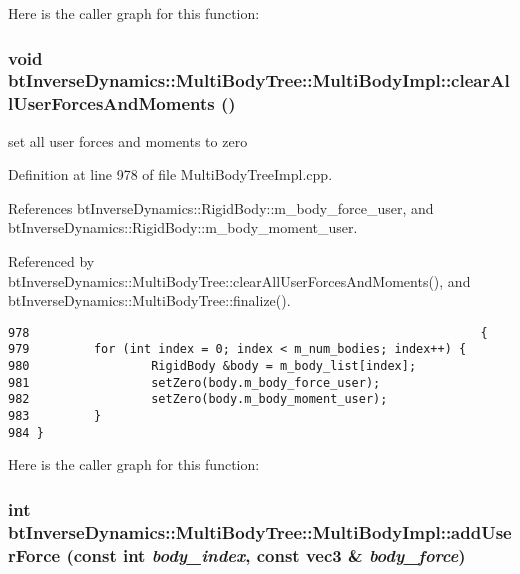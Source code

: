Here is the caller graph for this function:\hypertarget{classbt_inverse_dynamics_1_1_multi_body_tree_1_1_multi_body_impl_b3b1f5f6819d8c5529b4d029ea775d10}{
\subsubsection[clearAllUserForcesAndMoments]{\setlength{\rightskip}{0pt plus 5cm}void btInverseDynamics::MultiBodyTree::MultiBodyImpl::clearAllUserForcesAndMoments ()}}
\label{classbt_inverse_dynamics_1_1_multi_body_tree_1_1_multi_body_impl_b3b1f5f6819d8c5529b4d029ea775d10}


set all user forces and moments to zero  

Definition at line 978 of file MultiBodyTreeImpl.cpp.

References btInverseDynamics::RigidBody::m\_\-body\_\-force\_\-user, and btInverseDynamics::RigidBody::m\_\-body\_\-moment\_\-user.

Referenced by btInverseDynamics::MultiBodyTree::clearAllUserForcesAndMoments(), and btInverseDynamics::MultiBodyTree::finalize().

\begin{Code}\begin{verbatim}978                                                               {
979         for (int index = 0; index < m_num_bodies; index++) {
980                 RigidBody &body = m_body_list[index];
981                 setZero(body.m_body_force_user);
982                 setZero(body.m_body_moment_user);
983         }
984 }
\end{verbatim}
\end{Code}




Here is the caller graph for this function:\hypertarget{classbt_inverse_dynamics_1_1_multi_body_tree_1_1_multi_body_impl_4f1786c829da5d57e4758437a38b469c}{
\subsubsection[addUserForce]{\setlength{\rightskip}{0pt plus 5cm}int btInverseDynamics::MultiBodyTree::MultiBodyImpl::addUserForce (const int {\em body\_\-index}, \/  const {\bf vec3} \& {\em body\_\-force})}}
\label{classbt_inverse_dynamics_1_1_multi_body_tree_1_1_multi_body_impl_4f1786c829da5d57e4758437a38b469c}


